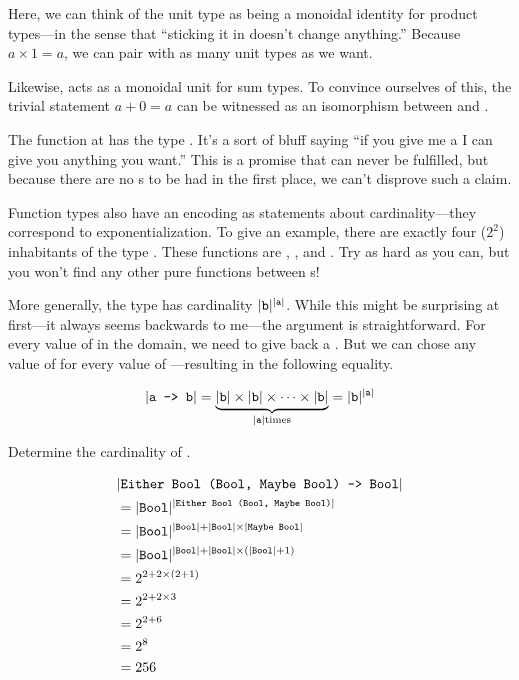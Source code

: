 \documentclass[book.tex]{subfiles}
\begin{document}

Here, we can think of the unit type as being a monoidal identity for product
types---in the sense that ``sticking it in doesn't change anything.'' Because $a
\times 1 = a$, we can pair with as many unit types as we want.

Likewise,  acts as a monoidal unit for sum types. To convince ourselves
of this, the trivial statement $a+0 = a$ can be witnessed as an isomorphism
between  and .


The function  at  has the type . It's a sort of
bluff saying ``if you give me a  I can give you anything you want.''
This is a promise that can never be fulfilled, but because there are no
s to be had in the first place, we can't disprove such a claim.

Function types also have an encoding as statements about cardinality---they
correspond to exponentialization. To give an example, there are exactly four
($2^2$) inhabitants of the type . These functions are ,
,  and . Try as hard as you can, but you
won't find any other pure functions between s!

More generally, the type  has cardinality $\lvert\texttt{b}\rvert^{\lvert\texttt{a}\rvert}$.
While this might be surprising at first---it always seems backwards to me---the
argument is straightforward. For every value of  in the domain, we need to
give back a . But we can chose any value of  for every value of
---resulting in the following equality.

$$
\lvert\texttt{a -> b}\rvert = \underbrace{\lvert\texttt{b}\rvert \times \lvert\texttt{b}\rvert \times \cdots \times
\lvert\texttt{b}\rvert}_{\lvert\texttt{a}\rvert \text{times}} = \lvert\texttt{b}\rvert^{\lvert\texttt{a}\rvert}
$$

\begin{exercise}
Determine the cardinality of .
\end{exercise}
\begin{solution}
\begin{align*}
  &  \lvert\texttt{Either Bool (Bool, Maybe Bool) -> Bool}\rvert \\
  &= \lvert\texttt{Bool}\rvert^{\lvert\texttt{Either Bool (Bool, Maybe Bool)}\rvert} \\
  &= \lvert\texttt{Bool}\rvert^{\lvert\texttt{Bool}\rvert+\lvert\texttt{Bool}\rvert\times\lvert\texttt{Maybe Bool}\rvert} \\
  &= \lvert\texttt{Bool}\rvert^{\lvert\texttt{Bool}\rvert+\lvert\texttt{Bool}\rvert\times(\lvert\texttt{Bool}\rvert+1)} \\
  &= 2^{2+2\times(2+1)} \\
  &= 2^{2+2\times 3} \\
  &= 2^{2+6} \\
  &= 2^{8} \\
  &= 256
\end{align*}
\end{solution}
\end{document}
